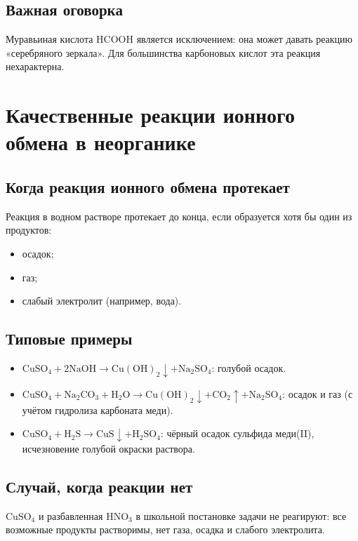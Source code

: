 \documentclass[a4paper,12pt]{article}
\begin{document}
\subsection{Важная оговорка}
Муравьиная кислота \(\mathrm{HCOOH}\) является исключением: она может давать реакцию «серебряного зеркала». Для большинства карбоновых кислот эта реакция нехарактерна.

\section{Качественные реакции ионного обмена в неорганике}

\subsection{Когда реакция ионного обмена протекает}
Реакция в водном растворе протекает до конца, если образуется хотя бы один из продуктов:
\begin{itemize}
    \item осадок;
    \item газ;
    \item слабый электролит (например, вода).
\end{itemize}

\subsection{Типовые примеры}
\begin{itemize}
    \item \(\mathrm{CuSO_4 + 2NaOH \rightarrow Cu(OH)_2\downarrow + Na_2SO_4}\): голубой осадок.
    \item \(\mathrm{CuSO_4 + Na_2CO_3 + H_2O \rightarrow Cu(OH)_2\downarrow + CO_2\uparrow + Na_2SO_4}\): осадок и газ (с учётом гидролиза карбоната меди).
    \item \(\mathrm{CuSO_4 + H_2S \rightarrow CuS\downarrow + H_2SO_4}\): чёрный осадок сульфида меди(II), исчезновение голубой окраски раствора.
\end{itemize}

\subsection{Случай, когда реакции нет}
\(\mathrm{CuSO_4}\) и разбавленная \(\mathrm{HNO_3}\) в школьной постановке задачи не реагируют: все возможные продукты растворимы, нет газа, осадка и слабого электролита.
\end{document}
